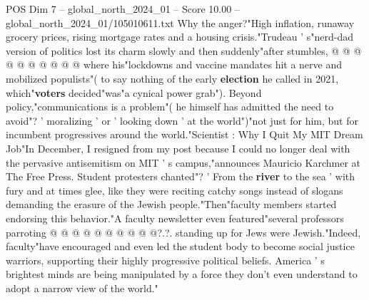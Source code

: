 \begin{textsample}{POS Dim 7 – global\_north\_2024\_01 – Score 10.00 – global\_north\_2024\_01/105010611.txt}
Why the anger?"High inflation, runaway grocery prices, rising mortgage rates and a housing crisis."Trudeau ' s"nerd-dad version of politics lost its charm slowly and then suddenly"after stumbles, @ @ @ @ @ @ @ @ @ @ where his"lockdowns and vaccine mandates hit a nerve and mobilized populists"( to say nothing of the early \textbf{election} he called in 2021, which"\textbf{voters} decided"was"a cynical power grab").
Beyond policy,"communications is a problem"( he himself has admitted the need to avoid"? ' moralizing ' or ' looking down ' at the world")"not just for him, but for incumbent progressives around the world."Scientist : Why I Quit My MIT Dream Job"In December, I resigned from my post because I could no longer deal with the pervasive antisemitism on MIT ' s campus,"announces Mauricio Karchmer at The Free Press.
Student protesters chanted"? ' From the \textbf{river} to the sea ' with fury and at times glee, like they were reciting catchy songs instead of slogans demanding the erasure of the Jewish people."Then"faculty members started endorsing this behavior."A faculty newsletter even featured"several professors parroting @ @ @ @ @ @ @ @ @ @?.?. standing up for Jews were Jewish."Indeed, faculty"have encouraged and even led the student body to become social justice warriors, supporting their highly progressive political beliefs.
America ' s brightest minds are being manipulated by a force they don't even understand to adopt a narrow view of the world."

\end{textsample}
